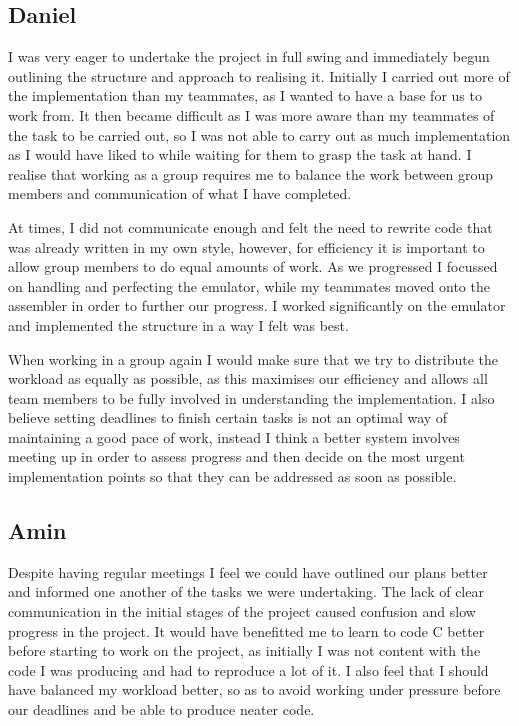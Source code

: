 \documentclass[11pt]{article}
\begin{document}
\subsection{Daniel}
I was very eager to undertake the project in full swing and immediately begun outlining the structure and approach to realising it. Initially I carried out more of the implementation than my teammates, as I wanted to have a base for us to work from. It then became difficult as I was more aware than my teammates of the task to be carried out, so I was not able to carry out as much implementation as I would have liked to while waiting for them to grasp the task at hand. 
I realise that working as a group requires me to balance the work between group members and communication of what I have completed. 

At times, I did not communicate enough and felt the need to rewrite code that was already written in my own style, however, for efficiency it is important to allow group members to do equal amounts of work. As we progressed I focussed on handling and perfecting the emulator, while my teammates moved onto the assembler in order to further our progress. I worked significantly on the emulator and implemented the structure in a way I felt was best. 

When working in a group again I would make sure that we try to distribute the workload as equally as possible, as this maximises our efficiency and allows all team members to be fully involved in understanding the implementation. I also believe setting deadlines to finish certain tasks is not an optimal way of maintaining a good pace of work, instead I think a better system involves meeting up in order to assess progress and then decide on the most urgent implementation points so that they can be addressed as soon as possible.

\subsection{Amin}
Despite having regular meetings I feel we could have outlined our plans better and informed one another of the tasks we were undertaking. The lack of clear communication in the initial stages of the project caused confusion and slow progress in the project.
It would have benefitted me to learn to code C better before starting to work on the project, as initially I was not content with the code I was producing and had to reproduce a lot of it. I also feel that I should have balanced my workload better, so as to avoid working under pressure before our deadlines and be able to produce neater code.
\end{document}
